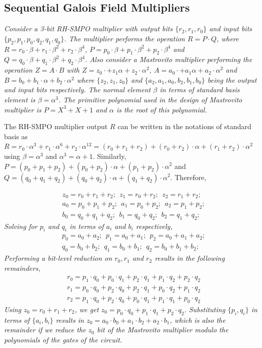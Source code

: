 \subsection{Sequential Galois Field Multipliers}
\begin{Example}
{\it Consider a 3-bit RH-SMPO multiplier with output bits $\{r_2,r_1,r_0\}$ and input bits $\{p_2,p_1,p_0,q_2,q_1,q_0\}$. 
The multiplier performs the operation $R=P\cdot Q$, where $R=r_0\cdot \beta + r_1\cdot \beta^2 + r_2\cdot \beta^4$, 
$P=p_0\cdot \beta + p_1\cdot \beta^2 + p_2\cdot \beta^4$ and $Q=q_0\cdot \beta +q_1\cdot \beta^2 + q_2\cdot \beta^4$. 
Also consider a Mastrovito multiplier performing the operation $Z=A\cdot B$ with $Z=z_0\cdot  + z_1 \alpha + z_2\cdot \alpha^2$,
 $A=a_0\cdot  + a_1 \alpha + a_2\cdot \alpha^2$ and $B=b_0  + b_1\cdot \alpha + b_2\cdot \alpha^2$ where $\{z_2,z_1,z_0\}$ and 
 $\{a_2,a_1,a_0,b_2,b_1,b_0\}$ being the output and input bits respectively. The normal element $\beta$ in terms of standard basis 
 element is $\beta = \alpha^3$. The primitive polynomial used in the design of Mastrovito multiplier is $P=X^3+X+1$ and $\alpha$ is the 
 root of this polynomial.
 \par The RH-SMPO multiplier output $R$ can be written in the notations of standard basis 
 as $R = r_0\cdot \alpha^3 + r_1\cdot \alpha^6 + r_2\cdot \alpha^{12} = (r_0 + r_1 + r_2) + (r_0 + r_2)\cdot \alpha + (r_1 + r_2)\cdot \alpha^2$ using $\beta = \alpha^3$ and $\alpha^3 = \alpha +1$. Similarly, $P = (p_0 + p_1 + p_2) + (p_0 + p_2)\cdot \alpha + (p_1 + p_2)\cdot \alpha^2$ and $Q = (q_0 + q_1 + q_2) + (q_0 + q_2)\cdot \alpha + (q_1 + q_2)\cdot \alpha^2$. Therefore, }
\begin{align*}
& z_0 = r_0 + r_1 + r_2; ~~ z_1 = r_0 + r_2; ~~ z_2 = r_1 + r_2; \\
& a_0 = p_0 + p_1 + p_2; ~~ a_1 = p_0 + p_2; ~~ a_2 = p_1 + p_2; \\
& b_0 = q_0 + q_1 + q_2; ~~ b_1 = q_0 + q_2; ~~ b_2 = q_1 + q_2;
\end{align*}
{\it Solving for $p_i$ and $q_i$ in terms of $a_i$ and $b_i$ respectively,}
\begin{align*}
& p_0 = a_0 + a_2; ~~ p_1 = a_0 + a_1; ~~ p_2 = a_0 + a_1 + a_2; \\
& q_0 = b_0 + b_2; ~~ q_1 = b_0 + b_1; ~~ q_2 = b_0 + b_1 + b_2;
\end{align*}
{\it Performing a bit-level reduction on $r_0,r_1$ and $r_2$ results in the following remainders,}
\begin{align*}
& r_0 = p_1\cdot q_0 + p_0\cdot q_1 + p_2\cdot q_1 + p_1\cdot q_2 + p_2\cdot q_2 \\
& r_1 = p_0\cdot q_0 + p_2\cdot q_0 + p_2\cdot q_1 + p_0\cdot q_2 + p_1\cdot q_2 \\
& r_2 = p_1\cdot q_0 + p_2\cdot q_0 + p_0\cdot q_1 + p_1\cdot q_1 + p_0\cdot q_2
\end{align*}
{\it Using $z_0 = r_0 + r_1 + r_2$, we get $z_0 = p_0\cdot q_0 + p_1\cdot q_1 + p_2\cdot q_2$. 
Substituting $\{p_i,q_i\}$ in terms of $\{a_i,b_i\}$ results in $z_0 = a_0\cdot b_0 + a_1\cdot b_2 + a_2\cdot b_1$,
which is also the remainder if we reduce the $z_0$ bit of the Mastrovito multiplier 
modulo the polynomials of the gates of the circuit.
}


\end{Example}
